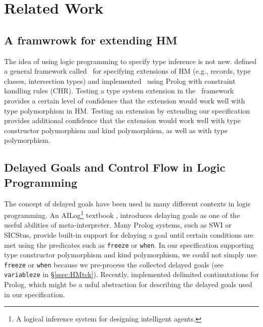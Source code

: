 \section{Related Work}\label{sec:relwork}
\subsection{A framwrowk for extending HM}
The idea of using logic programming to specify type inference is not new.
\citet*{HMX99} defined a general framework called \HMX\ for specifying
extensions of HM (e.g., records, type classes, intersection types)
and \citet{tyinferCHR02} implemented \HMX\ using Prolog with
constraint handling rules (CHR). Testing a type system extension
in the \HMX\ framework provides a certain level of confidence that the extension
would work well with type polymorphism in HM. Testing an extension by
extending our specification provides additional confidence that the extension
would work well with type constructor polymorphism and kind polymorphism,
as well as with type polymorphism.

\subsection{Delayed Goals and Control Flow in Logic Programming}
The concept of delayed goals have been used in many different contexts
in logic programming. An AILog\footnote{A logical inference system for designing
	 intelligent agents.} textbook \cite{AILogTextBook},
introduces delaying goals as one of the useful abilities of meta-interpreter.
Many Prolog systems, such as SWI or SICStus, provide built-in support for
delaying a goal until certain conditions are met using the predicates
such as \verb|freeze| or \verb|when|. In our specification supporting
type constructor polymorphism and kind polymorphism, we could not
simply use \verb|freeze| or \verb|when| because we pre-process
the collected delayed goals (see \verb|variableze| in \S\ref{ssec:HMtck}).
Recently, \citet{SchDemDesWei13} implemented delimited continutations for Prolog,
which might be a usful abstraction for describing the delayed goals used in
our specification.

